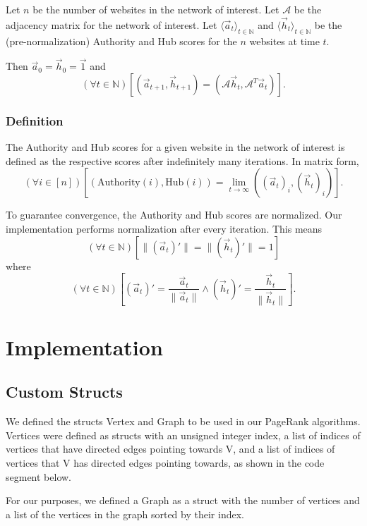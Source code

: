 \documentclass[12pt, titlepage, twoside]{amsart}
\newcommand{\N}{\ensuremath{\mathbb N}}
\begin{document}
Let $n$ be the number of websites in the network of interest.
Let $\mathcal{A}$ be the adjacency matrix for the network of interest.
Let $\langle\vec{a}_t\rangle_{t\in\N}$ and $\langle\vec{h}_t\rangle_{t\in\N}$ be the (pre-normalization)
Authority and Hub scores for the $n$ websites at time $t$.

Then $\vec{a}_0 = \vec{h}_0 = \vec{1}$ and
\[
  (\forall t\in\N)
  \left[
    \left(\vec{a}_{t + 1}, \vec{h}_{t + 1}\right) = \left(\mathcal{A}\vec{h}_t, \mathcal{A}^T\vec{a}_t\right)
  \right].
\]

\subsubsection{Definition} The Authority and Hub scores for a given website in the network of interest is defined
as the respective scores after indefinitely many iterations.
In matrix form,
\[
  (\forall i\in[n])
  \left[
    \left(\mathrm{Authority}(i), \mathrm{Hub}(i)\right) =
    \lim_{t\to\infty}
    \left((\vec{a}_t)_i, (\vec{h}_t)_i\right)
  \right].
\]

To guarantee convergence, the Authority and Hub scores are normalized.
Our implementation performs normalization after every iteration.
This means
\[
  (\forall t\in\N)
  \left[
    \lVert(\vec{a}_t)'\rVert = \lVert(\vec{h}_t)'\rVert = 1
  \right]
\]
where
\[
  (\forall t\in\N)
  \left[
    (\vec{a}_t)' = \frac{\vec{a}_t}{\lVert\vec{a}_t\rVert}
    \wedge
    (\vec{h}_t)' = \frac{\vec{h}_t}{\lVert\vec{h}_t\rVert}
  \right].
\]

\section{Implementation}

\subsection{Custom Structs}

We defined the structs Vertex and Graph to be used in our PageRank algorithms.
Vertices were defined as structs with an unsigned integer index, a list of indices of vertices that have directed edges pointing towards V,
and a list of indices of vertices that V has directed edges pointing towards,
as shown in the code segment below.

For our purposes, we defined a Graph as a struct with the number of vertices and a list of the vertices in the graph sorted by their index.
\end{document}
